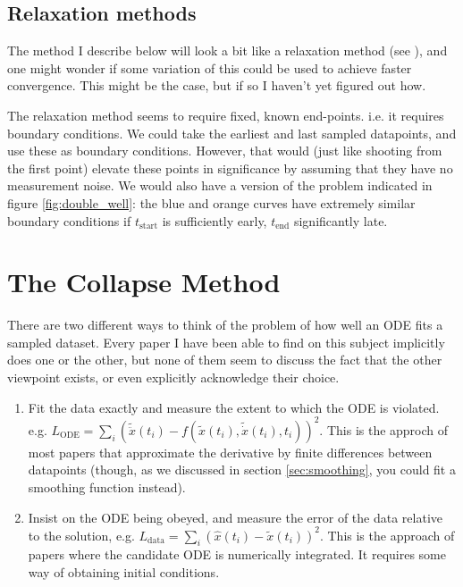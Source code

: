 \documentclass{article}
\begin{document}
\subsection{Relaxation methods}

The method I describe below will look a bit like a relaxation method (see \cite{wikipediaRelaxationMethod}), and one might wonder if some variation of this could be used to achieve faster convergence.
This might be the case, but if so I haven't yet figured out how.

The relaxation method seems to require fixed, known end-points.
i.e. it requires boundary conditions.
We could take the earliest and last sampled datapoints, and use these as boundary conditions.
However, that would (just like shooting from the first point) elevate these points in significance by assuming that they have no measurement noise.
We would also have a version of the problem indicated in figure \ref{fig:double_well}: the blue and orange curves have extremely similar boundary conditions if $t_{\mathrm{start}}$ is sufficiently early, $t_{\mathrm{end}}$ significantly late.

\section{The Collapse Method}
\label{sec:method}

There are two different ways to think of the problem of how well an ODE fits a sampled dataset. Every paper I have been able to find on this subject implicitly does one or the other, but none of them seem to discuss the fact that the other viewpoint exists, or even explicitly acknowledge their choice.
\begin{enumerate}
\item Fit the data exactly and measure the extent to which the ODE is violated. e.g. $L_{\mathrm{ODE}} = \sum_i \left( \tilde{\ddot{x}}(t_i) - f(\tilde{x}(t_i), \tilde{\dot{x}}(t_i), t_i)\right)^2$.
This is the approch of most papers that approximate the derivative by finite differences between datapoints (though, as we discussed in section \ref{sec:smoothing}, you could fit a smoothing function instead).
\item Insist on the ODE being obeyed, and measure the error of the data relative to the solution, e.g. $L_{\mathrm{data}} = \sum_i \left( \hat{x}(t_i) - \tilde{x}(t_i) \right)^2$.
This is the approach of papers where the candidate ODE is numerically integrated. It requires some way of obtaining initial conditions. 
\end{enumerate}
\end{document}
